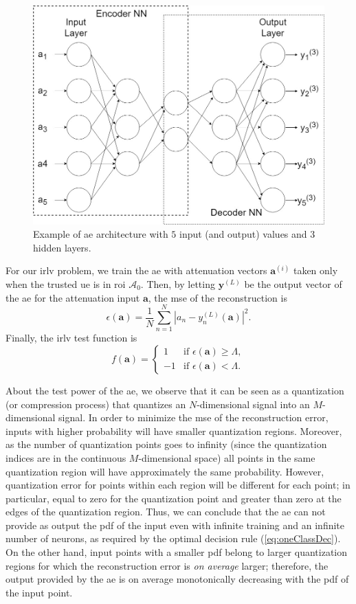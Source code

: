 \documentclass[draftcls,onecolumn,12pt]{IEEEtran}
\begin{document}
\begin{figure}[t]
    \centering
    \includegraphics[width=0.5\columnwidth]{AE.jpg}
    \caption{Example of \ac{ae} architecture with $5$ input (and output) values and 3 hidden layers.} 
    \label{fig:aeArch}
\end{figure}

For our \ac{irlv} problem, we train the \ac{ae} with attenuation vectors $\bm{a}^{(i)}$ taken only when the trusted \ac{ue} is in  \ac{roi} $\mathcal A_0$. Then, by letting $\bm{y}^{(L)}$ be the output vector of the \ac{ae} for the attenuation input $\bm{a}$, the \ac{mse} of the reconstruction is 
\begin{equation}\label{eq: rec err}
    \epsilon(\bm{a} ) = \frac{1}{N}\sum_{n=1}^{N}|a_n-y^{(L)}_n(\bm{a})|^2.
\end{equation}
Finally, the \ac{irlv} test function  is  
\begin{equation}
f(\bm{a}) =
\begin{cases}
1 &\text{if } \epsilon(\bm{a} ) \geq \Lambda, \\
-1 & \text{if } \epsilon(\bm{a} ) < \Lambda.
\end{cases}
\end{equation}

About the test power of the \ac{ae}, we observe that it can be seen as a quantization (or compression process) that quantizes an $N$-dimensional signal into an $M$-dimensional signal. In order to minimize the \ac{mse} of the reconstruction error, inputs with higher probability will have smaller quantization regions. Moreover, as the number of quantization points goes to infinity (since the quantization indices are in the continuous $M$-dimensional space) all points in the same quantization region will have approximately the same probability. However, quantization error for points within each region will be different for each point; in particular, equal to zero for the quantization point and greater than zero at the edges of the quantization region. Thus, we can conclude that the \ac{ae} can not provide as output the \ac{pdf} of the input even with infinite training and an infinite number of neurons, as required by the optimal decision rule (\ref{eq:oneClassDec}). On the other hand, input points with a smaller \ac{pdf} belong to larger quantization regions for which the reconstruction error is {\em on average} larger; therefore, the output provided by the \ac{ae} is on average monotonically decreasing with the \ac{pdf} of the input point. 
\end{document}
